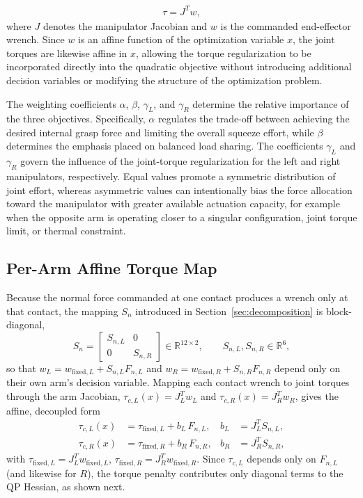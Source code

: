\documentclass[conference]{IEEEtran}
\begin{document}
\begin{align}
\tau = J^{T}w,
\end{align}
where $J$ denotes the manipulator Jacobian and $w$ is the commanded end-effector wrench. Since $w$ is an affine function of the optimization variable $x$, the joint torques are likewise affine in $x$, allowing the torque regularization to be incorporated directly into the quadratic objective without introducing additional decision variables or modifying the structure of the optimization problem.

The weighting coefficients $\alpha$, $\beta$, $\gamma_L$, and $\gamma_R$ determine the relative importance of the three objectives. Specifically, $\alpha$ regulates the trade-off between achieving the desired internal grasp force and limiting the overall squeeze effort, while $\beta$ determines the emphasis placed on balanced load sharing. The coefficients $\gamma_L$ and $\gamma_R$ govern the influence of the joint-torque regularization for the left and right manipulators, respectively. Equal values promote a symmetric distribution of joint effort, whereas asymmetric values can intentionally bias the force allocation toward the manipulator with greater available actuation capacity, for example when the opposite arm is operating closer to a singular configuration, joint torque limit, or thermal constraint.

\subsection{Per-Arm Affine Torque Map}

Because the normal force commanded at one contact produces a wrench only at that contact, the mapping $S_n$ introduced in Section~\ref{sec:decomposition} is block-diagonal,
\begin{equation}
S_n =
\begin{bmatrix}
S_{n,L} & 0 \\
0 & S_{n,R}
\end{bmatrix}
\in\mathbb{R}^{12\times2},
\qquad S_{n,L},S_{n,R}\in\mathbb{R}^{6},
\end{equation}
so that $w_L = w_{\mathrm{fixed},L} + S_{n,L}F_{n,L}$ and $w_R = w_{\mathrm{fixed},R}+S_{n,R}F_{n,R}$ depend only on their own arm's decision variable. Mapping each contact wrench to joint torques through the arm Jacobian, $\tau_{c,L}(x)=J_L^{T}w_L$ and $\tau_{c,R}(x)=J_R^{T}w_R$, gives the affine, decoupled form
\begin{align}
\tau_{c,L}(x) &= \tau_{\mathrm{fixed},L} + b_L\,F_{n,L}, &
b_L &= J_L^{T}S_{n,L}, \\
\tau_{c,R}(x) &= \tau_{\mathrm{fixed},R} + b_R\,F_{n,R}, &
b_R &= J_R^{T}S_{n,R},
\end{align}
with $\tau_{\mathrm{fixed},L}=J_L^{T}w_{\mathrm{fixed},L}$, $\tau_{\mathrm{fixed},R}=J_R^{T}w_{\mathrm{fixed},R}$. Since $\tau_{c,L}$ depends only on $F_{n,L}$ (and likewise for $R$), the torque penalty contributes only diagonal terms to the QP Hessian, as shown next.
\end{document}
